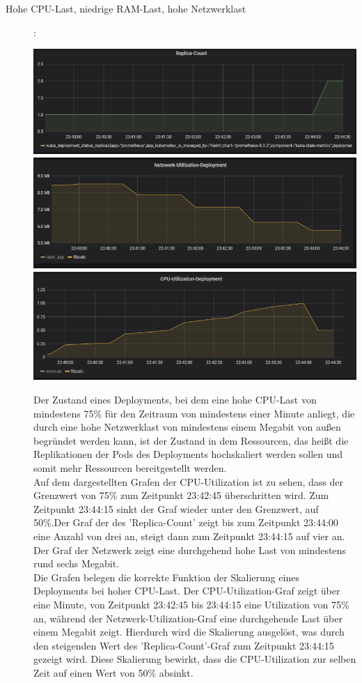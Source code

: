 \documentclass[a4paper,10pt]{scrartcl}
\begin{document}
\begin{description}

\item[Hohe CPU-Last, niedrige RAM-Last, hohe Netzwerklast]:\\

\begin{minipage}{\linewidth}
            \includegraphics[width=.5\textwidth]{img/CPUSkalierung/ReplicaCount.PNG}
            \includegraphics[scale=1,width=.5\textwidth,height=.14\textheight]{img/CPUSkalierung/Netzwerk.PNG}
  			\includegraphics[scale=1,width=.5\textwidth]{img/CPUSkalierung/CPUSaturation.PNG}
\end{minipage}

Der Zustand eines Deployments, bei dem eine hohe CPU-Last von mindestens 75\% für den Zeitraum von mindestens einer Minute anliegt, die durch eine  hohe Netzwerklast von mindestens einem Megabit von außen begründet werden kann, ist der Zustand in dem Ressourcen, das heißt die Replikationen der Pods des Deployments hochskaliert werden sollen und somit mehr Ressourcen bereitgestellt werden.\\
Auf dem dargestellten Grafen der CPU-Utilization ist zu sehen, dass der Grenzwert von 75\% zum Zeitpunkt 23:42:45 überschritten wird. Zum Zeitpunkt 23:44:15 sinkt der Graf wieder unter den Grenzwert, auf 50\%.Der Graf der des 'Replica-Count' zeigt bis zum Zeitpunkt 23:44:00 eine Anzahl von drei an, steigt dann zum Zeitpunkt 23:44:15 auf vier an. Der Graf der Netzwerk zeigt eine durchgehend hohe Last von mindestens rund sechs Megabit.\\
Die Grafen belegen die korrekte Funktion der Skalierung eines Deployments bei hoher CPU-Last. Der CPU-Utilization-Graf zeigt über eine Minute, von Zeitpunkt 23:42:45 bis 23:44:15 eine Utilization von 75\% an, während der Netzwerk-Utilization-Graf eine durchgehende Last über einem Megabit zeigt. Hierdurch wird die Skalierung ausgelöst, was durch den steigenden Wert des 'Replica-Count'-Graf zum Zeitpunkt 23:44:15 gezeigt wird. Diese Skalierung bewirkt, dass die CPU-Utilization zur selben Zeit auf einen Wert von 50\% absinkt.


\end{description}
\end{document}
